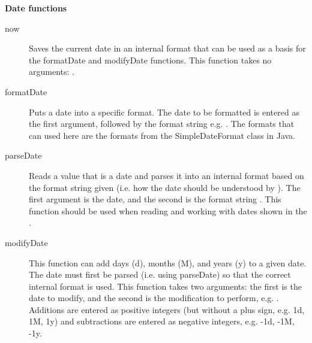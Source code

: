 \textbf{Date functions}\\
\begin{description}
\item [now]{Saves the current date in an internal format that can be used as a basis for the formatDate and modifyDate functions. This function takes no arguments: .}
\item [formatDate]{Puts a date into a specific format. The date to be formatted is entered as the first argument, followed by the format string e.g. . The formats that can used here are the formats from the SimpleDateFormat class in Java.}
\item [parseDate]{Reads a value that is a date and parses it into an internal format based on the format string given (i.e. how the date should be understood by \app{}). The first argument is the date, and the second is the format string  . This function should be used when reading and working with dates shown in the \gdaut{}. }
\item [modifyDate]{This function can add days (d), months (M), and years (y) to a given date. The date must first be parsed (i.e. using parseDate) so that the correct internal format is used. This function takes two arguments: the first is the date to modify, and the second is the modification to perform, e.g. . Additions are entered as positive integers (but without a plus sign, e.g. 1d, 1M, 1y) and subtractions are entered as negative integers, e.g. -1d, -1M, -1y.}
\end{description}


